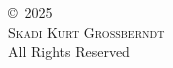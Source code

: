 \phantom{}\vspace{\fill}
\begin{center}
\copyright~2025\\
\textsc{Skadi Kurt Grossberndt}\\
All Rights Reserved\\
\end{center}
